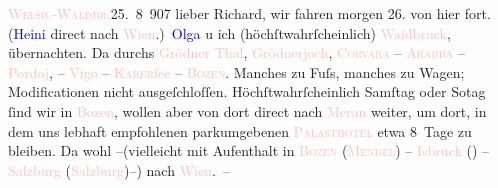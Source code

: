            \raggedleft{}{\pb}\textcolor{pink}{\textsc{Welsb.-Waldbr.}}{}\ledrightnote{\textcolor{pink}{Wildbad Waldbrunn}}{ }25. 8 907\pend
           \pstart{}lieber Richard,\pend\pstart
           wir fahren morgen 26. von hier fort. (\textcolor{blue}{Heini}{}\ledrightnote{\textcolor{blue}{Heinrich Schnitzler}} direct nach \textcolor{pink}{Wien}{}\ledrightnote{\textcolor{pink}{Wien}}.) \textcolor{blue}{Olga}{}\ledrightnote{\textcolor{blue}{Olga Schnitzler}} u ich (höchſtwahrſcheinlich) \textcolor{pink}{Waidbruck}{}\ledrightnote{\textcolor{pink}{Ponte Gardena}}, übernachten. Da{\geminationn} durchs \textcolor{pink}{Grödner Thal}{}\ledrightnote{\textcolor{pink}{Val Badia}}, \textcolor{pink}{Grödnerjoch}{}\ledrightnote{\textcolor{pink}{Grödner Joch}}, \textsc{\textcolor{pink}{Corvara}{}\ledrightnote{\textcolor{pink}{Corvara}} – \textcolor{pink}{Arabba}{}\ledrightnote{\textcolor{pink}{Arabba}}} – \textcolor{pink}{Pordoj}{}\ledrightnote{\textcolor{pink}{Pordoijoch}}, – \textcolor{pink}{Vigo}{}\ledrightnote{\textcolor{pink}{Vigo di Fassa}} – \textcolor{pink}{\textsc{Karer}ſee}{}\ledrightnote{\textcolor{pink}{Karersee}} – \textcolor{pink}{\textsc{Bozen}}{}\ledrightnote{\textcolor{pink}{Bozen}}. Manches zu Fuſs, manches zu Wagen; Modificationen nicht ausgeſchloſſen.
               Höchſtwahrſcheinlich Samſtag oder So{\geminationn}tag ſind wir in \textcolor{pink}{Bozen}{}\ledrightnote{\textcolor{pink}{Bozen}}, wollen aber \introOben{}von\introOben{}
               dort direct nach \textcolor{pink}{Meran}{}\ledrightnote{\textcolor{pink}{Meran}} weiter, um dort, in {\pb}dem uns lebhaft empfohlenen parkumgebenen \textcolor{pink}{\textsc{Palasthotel}}{}\ledrightnote{\textcolor{pink}{Palasthotel Meran}} etwa 8 Tage zu bleiben. Da{\geminationn} wohl –(vielleicht mit
               Aufenthalt in \textcolor{pink}{\textsc{Bozen}}{}\ledrightnote{\textcolor{pink}{Bozen}} (\textcolor{pink}{\textsc{Mendel}}{}\ledrightnote{\textcolor{pink}{Mendelpass}}) – \textcolor{pink}{I{\geminationn}sbruck}{}\ledrightnote{\textcolor{pink}{Innsbruck}}
                  (\label{K_L01702_1v}\label{K_L01702_1h}) – \textcolor{pink}{Salzburg}{}\ledrightnote{\textcolor{pink}{Salzburg}} (\textcolor{pink}{Salzburg}{}\ledrightnote{\textcolor{pink}{Salzburg}})–) nach \textcolor{pink}{Wien}{}\ledrightnote{\textcolor{pink}{Wien}}. –\pend
